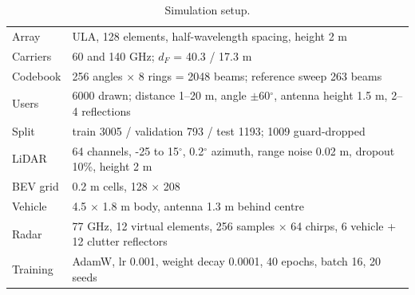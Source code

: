 \begin{table}[t]\centering\caption{Simulation setup.}\label{tab:setup}
\small\begin{tabular}{@{}lp{6.2cm}@{}}\toprule
Array & ULA, 128 elements, half-wavelength spacing, height 2 m \\
Carriers & 60 and 140 GHz; $d_F$ = 40.3 / 17.3 m \\
Codebook & 256 angles $\times$ 8 rings = 2048 beams; reference sweep 263 beams \\
Users & 6000 drawn; distance 1--20 m, angle $\pm$60$^\circ$, antenna height 1.5 m, 2--4 reflections \\
Split & train 3005 / validation 793 / test 1193; 1009 guard-dropped \\
LiDAR & 64 channels, -25 to 15$^\circ$, 0.2$^\circ$ azimuth, range noise 0.02 m, dropout 10\%, height 2 m \\
BEV grid & 0.2 m cells, 128 $\times$ 208 \\
Vehicle & 4.5 $\times$ 1.8 m body, antenna 1.3 m behind centre \\
Radar & 77 GHz, 12 virtual elements, 256 samples $\times$ 64 chirps, 6 vehicle + 12 clutter reflectors \\
Training & AdamW, lr 0.001, weight decay 0.0001, 40 epochs, batch 16, 20 seeds \\
\bottomrule\end{tabular}\end{table}
